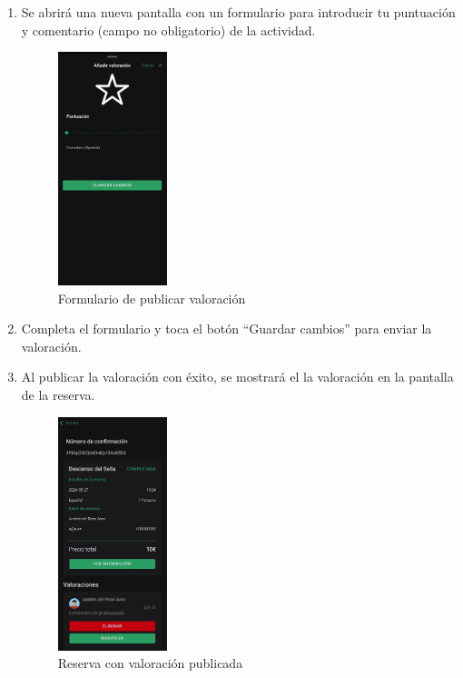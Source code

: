 \begin{enumerate}
	\item Se abrirá una nueva pantalla con un formulario para introducir tu puntuación y comentario (campo no obligatorio) de la actividad.
	      \begin{figure}[H]
		      \centering
		      \includegraphics[width=0.3\textwidth]{7-Construccion/Manuales/app/P3-Publicar.png}
		      \caption{Formulario de publicar valoración}
	      \end{figure}
	\item Completa el formulario y toca el botón “Guardar cambios” para enviar la valoración.
	\item Al publicar la valoración con éxito, se mostrará el la valoración en la pantalla de la reserva.
	      \begin{figure}[H]
		      \centering
		      \includegraphics[width=0.3\textwidth]{7-Construccion/Manuales/app/P4-Publicar.png}
		      \caption{Reserva con valoración publicada}
	      \end{figure}

\end{enumerate}
